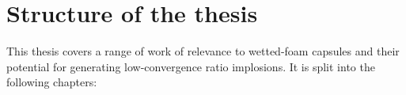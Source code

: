 


\section{Structure of the thesis}

This thesis covers a range of work of relevance to wetted-foam capsules and their potential for generating low-convergence ratio implosions. It is split into the following chapters:

